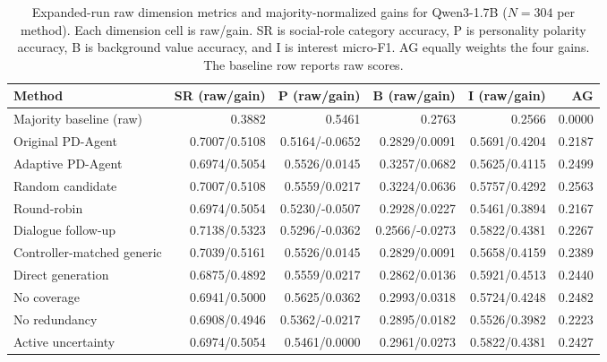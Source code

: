 \documentclass{ieeeaccess}
\begin{document}
\renewcommand{\thetable}{S3a}
\begin{table}[H]
\centering
\footnotesize
\setlength{\tabcolsep}{4pt}
\caption{Expanded-run raw dimension metrics and majority-normalized gains for Qwen3-1.7B ($N=304$ per method). Each dimension cell is raw/gain. SR is social-role category
accuracy, P is personality polarity accuracy, B is background value accuracy, and I is
interest micro-F1. AG equally weights the four gains. The baseline row reports raw scores.}
\label{tab:controller-ablation-raw-metrics}
\begin{tabular*}{\textwidth}{@{\extracolsep{\fill}}lrrrrr@{}}
\toprule
Method & SR (raw/gain) & P (raw/gain) & B (raw/gain) & I (raw/gain) & AG \\
\midrule
Majority baseline (raw) & 0.3882 & 0.5461 & 0.2763 & 0.2566 & 0.0000 \\
\midrule
Original PD-Agent & 0.7007/0.5108 & 0.5164/-0.0652 & 0.2829/0.0091 & 0.5691/0.4204 & 0.2187 \\
Adaptive PD-Agent & 0.6974/0.5054 & 0.5526/0.0145 & 0.3257/0.0682 & 0.5625/0.4115 & 0.2499 \\
Random candidate & 0.7007/0.5108 & 0.5559/0.0217 & 0.3224/0.0636 & 0.5757/0.4292 & 0.2563 \\
Round-robin & 0.6974/0.5054 & 0.5230/-0.0507 & 0.2928/0.0227 & 0.5461/0.3894 & 0.2167 \\
Dialogue follow-up & 0.7138/0.5323 & 0.5296/-0.0362 & 0.2566/-0.0273 & 0.5822/0.4381 & 0.2267 \\
Controller-matched generic & 0.7039/0.5161 & 0.5526/0.0145 & 0.2829/0.0091 & 0.5658/0.4159 & 0.2389 \\
Direct generation & 0.6875/0.4892 & 0.5559/0.0217 & 0.2862/0.0136 & 0.5921/0.4513 & 0.2440 \\
No coverage & 0.6941/0.5000 & 0.5625/0.0362 & 0.2993/0.0318 & 0.5724/0.4248 & 0.2482 \\
No redundancy & 0.6908/0.4946 & 0.5362/-0.0217 & 0.2895/0.0182 & 0.5526/0.3982 & 0.2223 \\
Active uncertainty & 0.6974/0.5054 & 0.5461/0.0000 & 0.2961/0.0273 & 0.5822/0.4381 & 0.2427 \\
\bottomrule
\end{tabular*}
\end{table}
\end{document}
